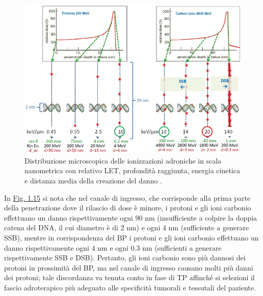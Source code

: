 \documentclass[12pt,a4paper,twoside]{report}
\begin{document}
	\begin{figure}[H]
		\centering
		\includegraphics[width=0.9\linewidth]{proton_carbon_let.jpg}
		\caption{Distribuzione microscopica delle ionizzazioni adroniche in scala nanometrica con relativo LET, profondità raggiunta, energia cinetica e distanza media della creazione del danno \cite{slide_spighi}.}
		\label{fig:proton_carbon_let}
	\end{figure}
	In \hyperref[fig:proton_carbon_let]{Fig. 1.15} si nota che nel canale di ingresso, che corrisponde alla prima parte della penetrazione dove il rilascio di dose è minore, i protoni e gli ioni carbonio effettuano un danno rispettivamente ogni $90 \mbox{ nm}$ (insufficiente a colpire la doppia catena del DNA, il cui diametro è di $2 \mbox{ nm}$) e ogni $4 \mbox{ nm}$ (sufficiente a generare SSB), mentre in corrispondenza del BP i protoni e gli ioni carbonio effettuano un danno rispettivamente ogni $4 \mbox{ nm}$ e ogni $0.3 \mbox{ nm}$ (sufficienti a generare rispettivamente SSB e DSB). Pertanto, gli ioni carbonio sono più dannosi dei protoni in prossimità del BP, ma nel canale di ingresso causano molti più danni dei protoni; tale discordanza va tenuta conto in fase di TP affinché si selezioni il fascio adroterapico più adeguato alle specificità tumorali e tessutali del paziente.
	
\end{document}
